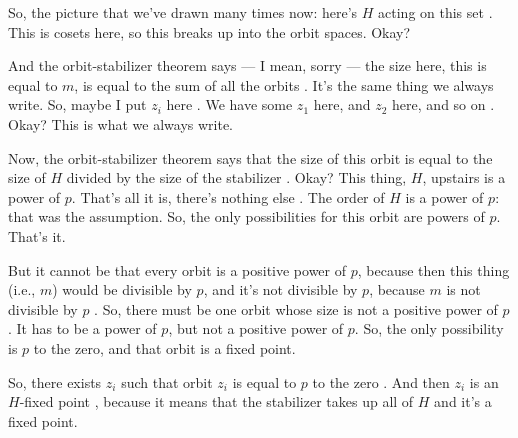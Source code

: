\begin{proofWrapper}
\begin{hidden}
\end{hidden}

\begin{speech}[00:25:40 - 00:27:50]
So, the picture that we've drawn many times now: here's $H$ acting on this set . This is cosets here, so this breaks up into the orbit spaces. Okay?

And the orbit-stabilizer theorem says --- I mean, sorry --- the size here, this is equal to $m$, is equal to the sum of all the orbits . It's the same thing we always write. So, maybe I put $z_i$ here . We have some $z_1$ here, and $z_2$ here, and so on . Okay? This is what we always write.

Now, the orbit-stabilizer theorem says that the size of this orbit is equal to the size of $H$ divided by the size of the stabilizer . Okay? This thing, $H$, upstairs is a power of $p$. That's all it is, there's nothing else . The order of $H$ is a power of $p$: that was the assumption. So, the only possibilities for this orbit are powers of $p$. That's it.

But it cannot be that every orbit is a positive power of $p$, because then this thing (i.e., $m$) would be divisible by $p$, and it's not divisible by $p$, because $m$ is not divisible by $p$ . So, there must be one orbit whose size is not a positive power of $p$. It has to be a power of $p$, but not a positive power of $p$. So, the only possibility is $p$ to the zero, and that orbit is a fixed point.

So, there exists $z_i$ such that orbit $z_i$ is equal to $p$ to the zero . And then $z_i$ is an $H$-fixed point , because it means that the stabilizer takes up all of $H$ and it's a fixed point.
\end{speech}


\end{proofWrapper}
